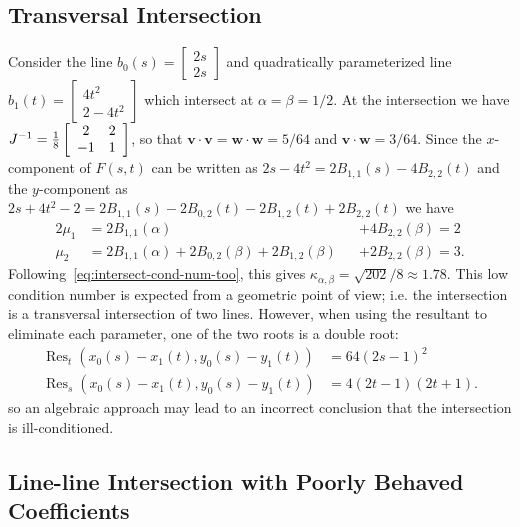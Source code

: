 \documentclass[3p, authoryear, square]{elsarticle}
\theoremstyle{definition}
\begin{document}
\subsection{Transversal Intersection}

Consider the line
\(b_0(s) = \left[ \begin{array}{c} 2s \\ 2s \end{array}\right]\)
and quadratically parameterized line
\(b_1(t) = \left[ \begin{array}{c} 4t^2 \\ 2 - 4t^2
\end{array}\right]\) which intersect at \(\alpha = \beta = 1/2\).
At the intersection we have \(J^{-1} = \frac{1}{8}
\left[ \begin{array}{c c} 2 & 2 \\ -1 & 1 \end{array}\right]\),
so that \(\bm{v} \cdot \bm{v} = \bm{w} \cdot \bm{w} =
5/64\) and \(\bm{v} \cdot \bm{w} = 3/64\). Since the
\(x\)-component of \(F(s, t)\) can be written as
\(2s - 4t^2 = 2 B_{1, 1}(s) - 4 B_{2, 2}(t)\) and the
\(y\)-component as \(2s + 4t^2 - 2 = 2 B_{1, 1}(s) - 2 B_{0, 2}(t)
- 2 B_{1, 2}(t) + 2 B_{2, 2}(t)\) we have
\begin{alignat}{2}
\mu_1 &= 2 B_{1, 1}(\alpha) &&+ 4 B_{2, 2}(\beta) = 2 \\
\mu_2 &= 2 B_{1, 1}(\alpha) + 2 B_{0, 2}(\beta) +
  2 B_{1, 2}(\beta) &&+ 2 B_{2, 2}(\beta) = 3.
\end{alignat}
Following~\eqref{eq:intersect-cond-num-too}, this gives
\(\kappa_{\alpha, \beta} = \sqrt{202}/8 \approx 1.78\).
This low condition number is expected from a geometric point of view; i.e.
the intersection is a transversal intersection of two lines. However,
when using the resultant to eliminate each parameter, one of the two roots is
a double root:
\begin{align}
\operatorname{Res}_t\left(x_0(s) - x_1(t), y_0(s) - y_1(t)\right) &=
  64(2s - 1)^2 \\
\operatorname{Res}_s\left(x_0(s) - x_1(t), y_0(s) - y_1(t)\right) &=
  4(2t - 1)(2t + 1).
\end{align}
so an algebraic approach may lead to an incorrect conclusion that the
intersection is ill-conditioned.

\subsection{Line-line Intersection with Poorly Behaved Coefficients}
\end{document}
